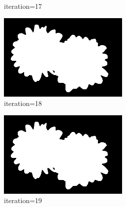 \documentclass{article}
\begin{document}
\begin{figure}[t]
\begin{subfigure}[t]{0.19\textwidth}
\vspace{-0.6cm}
\caption{iteration=17}
\end{subfigure}
\begin{subfigure}[t]{0.19\textwidth}
\centering
\includegraphics[width=\textwidth]{./images/marginals_iter_18.png}
\vspace{-0.6cm}
\caption{iteration=18}
\end{subfigure}
\begin{subfigure}[t]{0.19\textwidth}
\centering
\includegraphics[width=\textwidth]{./images/marginals_iter_19.png}
\vspace{-0.6cm}
\caption{iteration=19}
\end{subfigure}
\begin{subfigure}[t]{0.19\textwidth}
\centering

\end{subfigure}
\end{figure}
\end{document}
